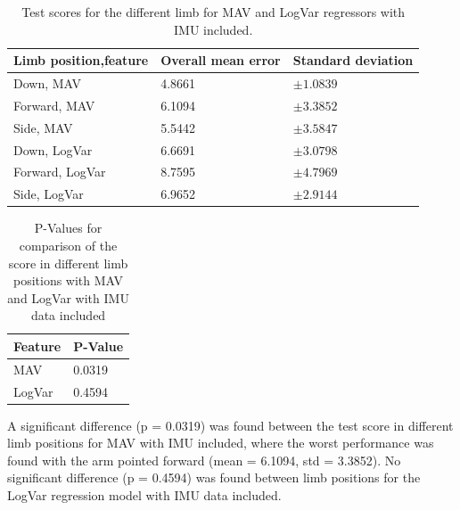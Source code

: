 \documentclass[a4paper, 10pt, conference]{ieeeconf}      %
\begin{document}
\begin{multicol}{2}
	\begin{table}[H]
		\begin{center}
			\begin{tabular}{l l l}
				\hline
				\textbf{Limb position,feature} & \textbf{Overall mean error} & \textbf{Standard deviation}\\
				\hline
				Down, MAV & 4.8661 & $\pm 1.0839$ \\
				Forward, MAV & 6.1094 & $\pm 3.3852$ \\
				Side, MAV & 5.5442 & $\pm 3.5847$ \\
				Down, LogVar & 6.6691 & $\pm 3.0798$ \\
				Forward, LogVar & 8.7595 & $\pm 4.7969$ \\
				Side, LogVar & 6.9652 & $\pm 2.9144$ \\
				\hline
			\end{tabular}
			\caption{Test scores for the different limb for MAV and LogVar regressors with IMU included.}
		\end{center}
	\end{table}
	
	\begin{table}[H]	
		\begin{center}
			\begin{tabular}{l l}
				\hline
				\textbf{Feature} & \textbf{P-Value}\\
				\hline
				MAV & 0.0319 \\
				LogVar & 0.4594 \\
				\hline
			\end{tabular}
			\caption{P-Values for comparison of the score in different limb positions with MAV and LogVar with IMU data included}
		\end{center}
	\end{table}
	
	A significant difference (p = 0.0319) was found between the test score in different limb positions for MAV with IMU included, where the worst performance was found with the arm pointed forward (mean = 6.1094, std = 3.3852). No significant difference (p = 0.4594) was found between limb positions for the LogVar regression model with IMU data included.
	

\end{multicol}
\end{document}
